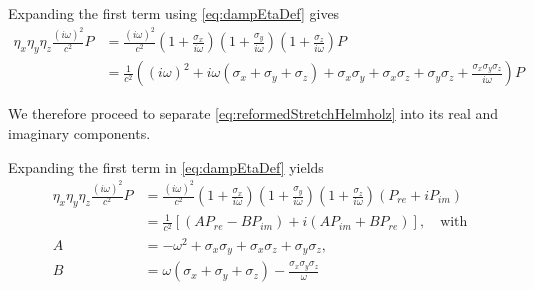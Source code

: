 \documentclass[final,num,12pt]{elsarticle}
\begin{document}
Expanding the first term using \cref{eq:dampEtaDef} gives 
 \begin{equation}
   \begin{aligned}
      \eta_x\eta_y\eta_z\frac{(i\omega)^2}{c^2}P &= \frac{(i\omega)^2}{c^2}\left(1+\frac{\sigma_x}{i\omega}\right)\left(1+\frac{\sigma_y}{i\omega}\right)\left(1+\frac{\sigma_z}{i\omega}\right)P \\
      &= \frac{1}{c^2}\left((i\omega)^2 + i\omega(\sigma_x+\sigma_y+\sigma_z) + \sigma_x\sigma_y + \sigma_x\sigma_z +\sigma_y\sigma_z + \frac{\sigma_x\sigma_y\sigma_z}{i\omega}\right)P  
 \end{aligned} 
 \label{eq:1stTermExt}
 \end{equation}
 
 We therefore proceed to separate \cref{eq:reformedStretchHelmholz} into its real and imaginary components. 

 Expanding the first term in \cref{eq:dampEtaDef} yields
 \begin{equation}
   \begin{aligned}
      \eta_x\eta_y\eta_z\frac{(i\omega)^2}{c^2}P &= \frac{(i\omega)^2}{c^2}\left(1+\frac{\sigma_x}{i\omega}\right)\left(1+\frac{\sigma_y}{i\omega}\right)\left(1+\frac{\sigma_z}{i\omega}\right)(P_{re} + iP_{im}) \\
      &=\frac{1}{c^2}
\left[ (AP_{re} - BP_{im})
+ i(AP_{im} + BP_{re}) \right], \quad \text{with} \\
A &= -\omega^2 + \sigma_x\sigma_y + \sigma_x\sigma_z + \sigma_y\sigma_z,\\
B &= \omega(\sigma_x+\sigma_y+\sigma_z) - \frac{\sigma_x\sigma_y\sigma_z}{\omega}
 \end{aligned} 
 \end{equation}
 
\end{document}
